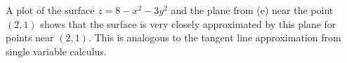 \begin{exercises}
\begin{exerciseSolution}
	\item A plot of the surface $z = 8 - x^2 - 3y^2$ and the plane from (e) near the point $(2,1)$ shows that the surface is very closely approximated by this plane for points near $(2,1)$. This is analogous to the tangent line approximation from single variable calculus. 
\ea
\end{exerciseSolution}


\end{exercises}
\afterexercises
